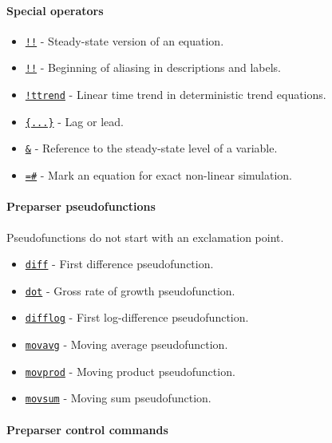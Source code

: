 \paragraph{Special operators}\label{special-operators}

\begin{itemize}
\itemsep1pt\parskip0pt
\item
  \href{modellang/sstateversion}{\texttt{!!}} - Steady-state version of
  an equation.
\item
  \href{modellang/alias}{\texttt{!!}} - Beginning of aliasing in
  descriptions and labels.
\item
  \href{modellang/ttrend}{\texttt{!ttrend}} - Linear time trend in
  deterministic trend equations.
\item
  \href{modellang/laglead}{\texttt{\{...\}}} - Lag or lead.
\item
  \href{modellang/sstateref}{\texttt{\&}} - Reference to the
  steady-state level of a variable.
\item
  \href{modellang/exactnonlin}{\texttt{=\#}} - Mark an equation for
  exact non-linear simulation.
\end{itemize}

\paragraph{Preparser pseudofunctions}\label{preparser-pseudofunctions}

Pseudofunctions do not start with an exclamation point.

\begin{itemize}
\itemsep1pt\parskip0pt
\item
  \href{modellang/diff}{\texttt{diff}} - First difference
  pseudofunction.
\item
  \href{modellang/dot}{\texttt{dot}} - Gross rate of growth
  pseudofunction.
\item
  \href{modellang/difflog}{\texttt{difflog}} - First log-difference
  pseudofunction.
\item
  \href{modellang/movavg}{\texttt{movavg}} - Moving average
  pseudofunction.
\item
  \href{modellang/movprod}{\texttt{movprod}} - Moving product
  pseudofunction.
\item
  \href{modellang/movsum}{\texttt{movsum}} - Moving sum pseudofunction.
\end{itemize}

\paragraph{Preparser control commands}\label{preparser-control-commands}

